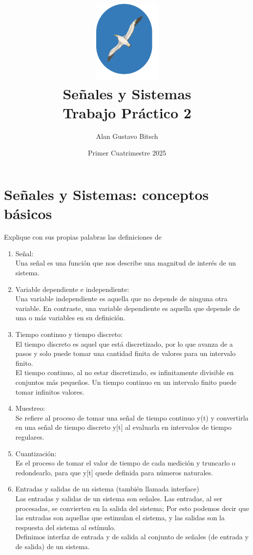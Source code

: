 \documentclass[11pt]{article}
\title{
    \includegraphics[width=0.25\textwidth]{unpsjb_notext.png} \\
    \vspace{1.5cm}
    Señales y Sistemas \\ 
    Trabajo Práctico 2
    }
\date {Primer Cuatrimestre 2025}
\author{Alan Gustavo Bitsch}
\newcommand{\rta}{\\}
\begin{document}
\maketitle



\section{Señales y Sistemas: conceptos básicos}
Explique con sus propias palabras las definiciones de
\begin{enumerate}
    \item Señal:
    \rta Una señal es una función que nos describe una magnitud de interés de un sistema.
    
    \item Variable dependiente e independiente:
    \rta Una variable independiente es aquella que no depende de ninguna otra variable. En contraste, una variable dependiente es aquella que depende de una o más variables en su definición.
    
    \item Tiempo continuo y tiempo discreto:
    \rta El tiempo discreto es aquel que está discretizado, por lo que avanza de a pasos y solo puede tomar una cantidad finita de valores para un intervalo finito.
    \rta El tiempo continuo, al no estar discretizado, es infinitamente divisible en conjuntos más pequeños. Un tiempo continuo en un intervalo finito puede tomar infinitos valores.
    
    \item Muestreo:
    \rta Se refiere al proceso de tomar una señal de tiempo continuo y(t) y convertirla en una señal de tiempo discreto y[t] al evaluarla en intervalos de tiempo regulares. 
    
    \item Cuantización:
    \rta Es el proceso de tomar el valor de tiempo de cada medición y truncarlo o redondearlo, para que y[t] quede definida para números naturales.   
    
    \item Entradas y salidas de un sistema (también llamada interface)
    \rta Las entradas y salidas de un sistema son señales. Las entradas, al ser procesadas, se convierten en la salida del sistema; Por esto podemos decir que las entradas son aquellas que estimulan el sistema, y las salidas son la respuesta del sistema al estímulo.
    \rta Definimos interfaz de entrada y de salida al conjunto de señales (de entrada y de salida) de un sistema.
    

\end{enumerate}
\end{document}
